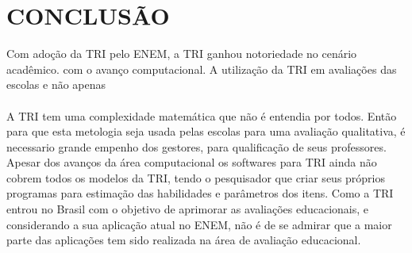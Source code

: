 \section{CONCLUSÃO}

	Com adoção da TRI pelo ENEM, a TRI ganhou notoriedade no cenário acadêmico. com o avanço computacional. A utilização da TRI em avaliações das escolas e não apenas 
	\paragraph{}
	A TRI tem uma complexidade matemática que não é entendia por todos. Então para que esta metologia seja usada pelas escolas para uma avaliação qualitativa, é necessario grande empenho dos gestores, para qualificação de seus professores.
	Apesar dos avanços da área computacional os softwares para TRI ainda não cobrem todos os modelos da TRI, tendo o pesquisador que criar seus próprios programas para estimação das habilidades e parâmetros dos itens.
	Como a TRI entrou no Brasil com o objetivo de aprimorar as avaliações educacionais, e considerando a sua aplicação atual no ENEM, não é de se admirar que a maior parte das aplicações tem sido realizada na área de avaliação educacional.
\cite{Dalton}
\newpage